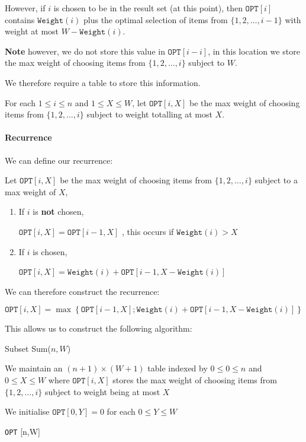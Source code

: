 \documentclass{article}
\begin{document}
However, if $i$ is chosen to be in the result set (at this point), then $\texttt{OPT} [i]$ contains $\texttt{Weight} (i)$ plus the optimal selection of items from $\{ 1,2,\ldots,i-1 \} $ with weight at most $W - \texttt{Weight} (i)$.

\textbf{Note} however, we do not store this value in $\texttt{OPT} [i-i]$, in this location we store the max weight of choosing items from $\{ 1,2,\ldots,i \} $ subject to $W$.

We therefore require a table to store this information.

For each $1 \leq i \leq n$ and $1 \leq X \leq W$, let $\texttt{OPT} [i,X]$ be the max weight of choosing items from $\{ 1,2,\ldots, i\} $ subject to weight totalling at most $X$.

\paragraph{Recurrence}

We can define our recurrence:

Let $\texttt{OPT} [i,X]$ be the max weight of choosing items from $\{ 1,2,\ldots,i \} $ subject to a max weight of $X$,

\begin{enumerate}
  \item If $i$ is \textbf{not} chosen,

        $\texttt{OPT} [i,X] = \texttt{OPT} [i-1,X]$ , this occurs if $\texttt{Weight} (i) > X$

  \item If $i$ is chosen,

        $\texttt{OPT} [i,X] = \texttt{Weight} (i) + \texttt{OPT} [i-1,X-\texttt{Weight}(i) ]$
\end{enumerate}


We can therefore construct the recurrence:

\[
  \texttt{OPT} [i,X] = \max \left\{ \texttt{OPT} [i-1,X] ; \texttt{Weight} (i) + \texttt{OPT} [i-1,X-\texttt{Weight}(i) ]\right\}
\]


This allows us to construct the following algorithm:

\begin{algorithm}
  \caption{Subset Sum($n,W$)}
  We maintain an $(n+1)\times (W+1)$ table indexed by $0 \leq 0 \leq n$ and $0 \leq X \leq W$ where $\texttt{OPT} [i,X]$ stores the max weight of choosing items from $\{ 1,2,\ldots,i \} $ subject to weight being at most $X$

  We initialise $\texttt{OPT} [0,Y]=0$ for each $0 \leq Y \leq W$


  \Return \texttt{OPT} [n,W]
\end{algorithm}
\end{document}
